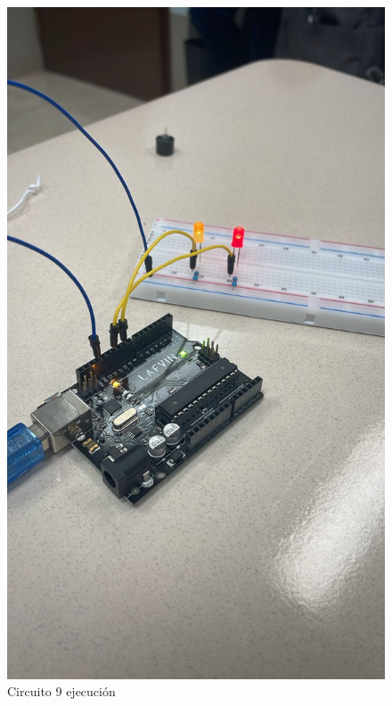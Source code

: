 \begin{figure}[H]
  \centering
  \includegraphics[scale = 0.3]{Imagenes/circDesarrollados/cd_9_ejecucion.jpg}
  \caption{Circuito 9 ejecución}
\end{figure}

